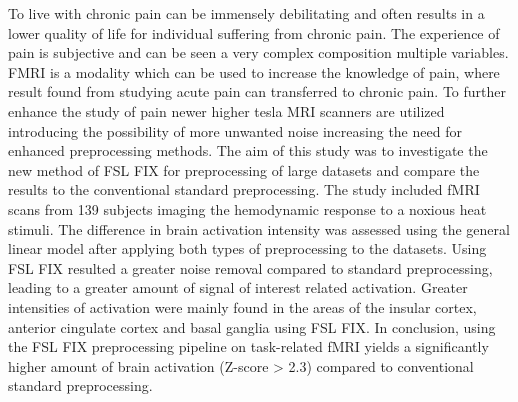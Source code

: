 To live with chronic pain can be immensely debilitating and often results in a lower quality of life for individual suffering from chronic pain. The experience of pain is subjective and can be seen a very complex composition multiple variables. FMRI is a modality which can be used to increase the knowledge of pain, where result found from studying acute pain can transferred to chronic pain. To further enhance the study of pain newer higher tesla MRI scanners are utilized introducing the possibility of more unwanted noise increasing the need for enhanced preprocessing methods. The aim of this study was to investigate the new method of FSL FIX for preprocessing of large datasets and compare the results to the conventional standard preprocessing. The study included fMRI scans from 139 subjects imaging the hemodynamic response to a noxious heat stimuli. The difference in brain activation intensity was assessed using the general linear model after applying both types of preprocessing to the datasets. Using FSL FIX resulted a greater noise removal compared to standard preprocessing, leading to a greater amount of signal of interest related activation. Greater intensities of activation were mainly found in the areas of the insular cortex, anterior cingulate cortex and basal ganglia using FSL FIX. In conclusion, using the FSL FIX preprocessing pipeline on task-related fMRI yields a significantly higher amount of brain activation (Z-score > 2.3) compared to conventional standard preprocessing. 